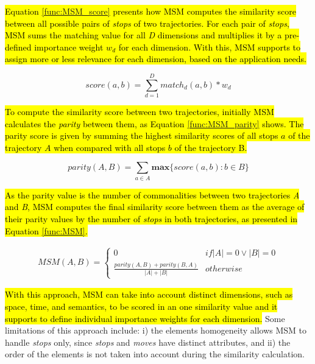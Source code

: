 \hl{Equation {\ref{func:MSM_score}} presents how MSM computes the similarity score between all possible pairs of \emph{stops} of two trajectories. For each pair of \emph{stops}, MSM sums the matching value for all \emph{D} dimensions and multiplies it by a pre-defined importance weight $w_d$ for each dimension. With this, MSM supports to assign more or less relevance for each dimension, based on the application needs.}

\begin{equation}
\label{func:MSM_score}
score(a, b) = \sum\limits_{d=1}^D match_d(a, b) * w_d
\end{equation}

\hl{To compute the similarity score between two trajectories, initially MSM calculates the \emph{parity} between them, as Equation {\ref{func:MSM_parity}} shows. The parity score is given by summing the highest similarity scores of all stops $a$ of the trajectory $A$ when compared with all stops $b$ of the trajectory B.}

\begin{equation}
\label{func:MSM_parity}
parity(A, B) = \sum\limits_{a\in A} \textbf{max}\{\textit{score}(a, b) : b \in B\}
\end{equation}

\hl{As the parity value is the number of commonalities between two trajectories \emph{A} and \emph{B}, MSM computes the final similarity score between them as the average of their parity values by the number of \emph{stops} in both trajectories, as presented in Equation {\ref{func:MSM}}.}

\begin{equation}
\label{func:MSM}
\begin{split}
  MSM(A, B) = 
  \begin{cases} 
      0 & if  |A| = 0 \vee |B| = 0 \\
      \frac{parity(A, B) + parity(B, A)}{|A| + |B|} & otherwise
  \end{cases}
\end{split}
\end{equation}

\hl{With this approach, MSM can take into account distinct dimensions, such as space, time, and semantics, to be scored in an one similarity value and it supports to define individual importance weights for each dimension.}
Some limitations of this approach include: i) the elements homogeneity allows MSM to handle \textit{stops} only, since \textit{stops} and \textit{moves} have distinct attributes, and ii) the order of the elements is not taken into account during the similarity calculation.

